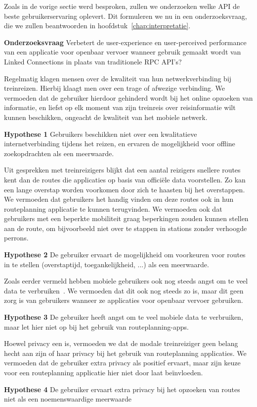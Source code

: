 Zoals in de vorige sectie werd besproken, zullen we onderzoeken welke API de beste gebruikerservaring oplevert. Dit formuleren we nu in een onderzoeksvraag, die we zullen beantwoorden in hoofdstuk~\ref{chap:interpretatie}.
 
\textbf{Onderzoeksvraag} Verbetert de user-experience en user-perceived performance van een applicatie voor openbaar vervoer wanneer gebruik gemaakt wordt van Linked Connections in plaats van traditionele RPC API's?
 
Regelmatig klagen mensen over de kwaliteit van hun netwerkverbinding bij treinreizen. Hierbij klaagt men over een trage of afwezige verbinding. We vermoeden dat de gebruiker hierdoor gehinderd wordt bij het online opzoeken van informatie, en liefst op elk moment van zijn treinreis over reisinformatie wilt kunnen beschikken, ongeacht de kwaliteit van het mobiele netwerk.

\textbf{Hypothese 1} Gebruikers beschikken niet over een kwalitatieve internetverbinding tijdens het reizen, en ervaren de mogelijkheid voor offline zoekopdrachten als een meerwaarde.
 
Uit gesprekken met treinreizigers blijkt dat een aantal reizigers snellere routes kent dan de routes die applicaties op basis van officiële data voorstellen. Zo kan een lange overstap worden voorkomen door zich te haasten bij het overstappen. We vermoeden dat gebruikers het handig vinden om deze routes ook in hun routeplanning applicatie te kunnen terugvinden. We vermoeden ook dat gebruikers met een beperkte mobiliteit graag beperkingen zouden kunnen stellen aan de route, om bijvoorbeeld niet over te stappen in stations zonder verhoogde perrons.

\textbf{Hypothese 2} De gebruiker ervaart de mogelijkheid om voorkeuren voor routes in te stellen (overstaptijd, toegankelijkheid, ...) als een meerwaarde.
 
Zoals eerder vermeld hebben mobiele gebruikers ook nog steeds angst om te veel data te verbruiken~\citep{ammelrooy17}. We vermoeden dat dit ook nog steeds zo is, maar dit geen zorg is van gebruikers wanneer ze applicaties voor openbaar vervoer gebruiken.

\textbf{Hypothese 3} De gebruiker heeft angst om te veel mobiele data te verbruiken, maar let hier niet op bij het gebruik van routeplanning-apps.
 
Hoewel privacy een  is, vermoeden we dat de modale treinreiziger geen belang hecht aan zijn of haar privacy bij het gebruik van routeplanning applicaties. We vermoeden dat de gebruiker extra privacy als positief ervaart, maar zijn keuze voor een routeplanning applicatie hier niet door laat beïnvloeden.

\textbf{Hypothese 4} De gebruiker ervaart extra privacy bij het opzoeken van routes niet als een noemenswaardige meerwaarde